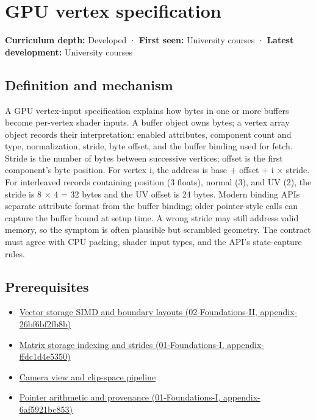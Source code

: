 \hypertarget{appendix-749ba51a6c25}{}
\section{GPU vertex specification}\label{appendix-749ba51a6c25-gpu-vertex-specification}

\textbf{Curriculum depth:} Developed · \textbf{First seen:} University courses · \textbf{Latest development:} University courses

\subsection{Definition and mechanism}\label{appendix-749ba51a6c25-definition-and-mechanism}

A GPU vertex-input specification explains how bytes in one or more buffers become per-vertex shader inputs. A buffer object owns bytes; a vertex array object records their interpretation: enabled attributes, component count and type, normalization, stride, byte offset, and the buffer binding used for fetch. Stride is the number of bytes between successive vertices; offset is the first component's byte position. For vertex i, the address is base + offset + i × stride. For interleaved records containing position (3 floats), normal (3), and UV (2), the stride is 8 × 4 = 32 bytes and the UV offset is 24 bytes. Modern binding APIs separate attribute format from the buffer binding; older pointer-style calls can capture the buffer bound at setup time. A wrong stride may still address valid memory, so the symptom is often plausible but scrambled geometry. The contract must agree with CPU packing, shader input types, and the API's state-capture rules.

\subsection{Prerequisites}\label{appendix-749ba51a6c25-prerequisites}

\begin{itemize}
\tightlist
\item
  \href{../02-Foundations-II/main.pdf\#nameddest=appendix-26bf6bf2fb8b}{Vector storage SIMD and boundary layouts (02-Foundations-II, appendix-26bf6bf2fb8b)}
\item
  \href{../01-Foundations-I/main.pdf\#nameddest=appendix-ffdc1d4e5350}{Matrix storage indexing and strides (01-Foundations-I, appendix-ffdc1d4e5350)}
\item
  \hyperref[appendix-1c07d64f5e70]{Camera view and clip-space pipeline}
\item
  \href{../01-Foundations-I/main.pdf\#nameddest=appendix-6af5921bc853}{Pointer arithmetic and provenance (01-Foundations-I, appendix-6af5921bc853)}
\end{itemize}

